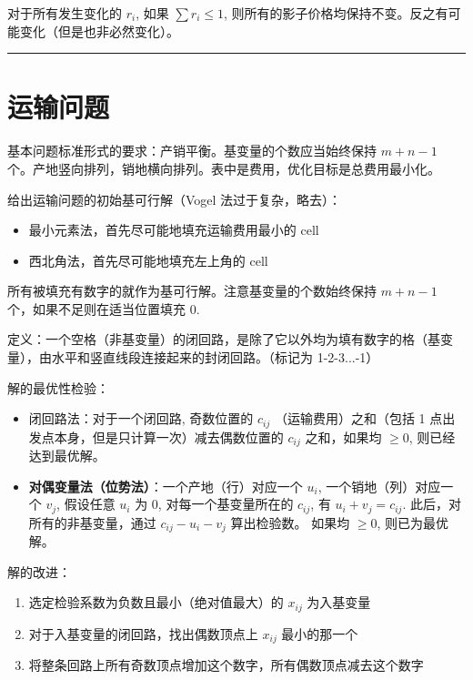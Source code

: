 \documentclass[UTF8, 6pt]{ctexart}
\newcommand{\mcompress}{\vspace{-10 px}}
\newcommand{\sectionline}{\rule[2pt]{0.45\textwidth}{0.05em}}
\begin{document}
对于所有发生变化的 $r_i$, 如果 $\sum r_i \leq 1$, 则所有的影子价格均保持不变。反之有可能变化（但是也非必然变化）。




\sectionline

\mcompress
\mcompress

\section{运输问题}

基本问题标准形式的要求：产销平衡。基变量的个数应当始终保持 $m+n-1$ 个。产地竖向排列，销地横向排列。表中是费用，优化目标是总费用最小化。

给出运输问题的初始基可行解（Vogel 法过于复杂，略去）：

\begin{itemize}
	\item 最小元素法，首先尽可能地填充运输费用最小的 cell
	\item 西北角法，首先尽可能地填充左上角的 cell
\end{itemize}

所有被填充有数字的就作为基可行解。注意基变量的个数始终保持 $m+n-1$ 个，如果不足则在适当位置填充 0.

定义：一个空格（非基变量）的闭回路，是除了它以外均为填有数字的格（基变量），由水平和竖直线段连接起来的封闭回路。（标记为 1-2-3...-1）

解的最优性检验：

\begin{itemize}
	\item 闭回路法：对于一个闭回路, 奇数位置的 $c_{ij}$ （运输费用）之和（包括 1 点出发点本身，但是只计算一次）减去偶数位置的 $c_{ij}$ 之和，如果均 $\geq 0$, 则已经达到最优解。
	\item \textbf{对偶变量法（位势法）}：一个产地（行）对应一个 $u_i$, 一个销地（列）对应一个 $v_j$, 假设任意 $u_i$ 为 0, 对每一个基变量所在的 $c_{ij}$, 有 $u_i + v_j = c_{ij}$.
	此后，对所有的非基变量，通过 $c_{ij} - u_i - v_j$ 算出检验数。
	如果均 $\geq 0$, 则已为最优解。
\end{itemize}

解的改进：

\begin{enumerate}
	\item 选定检验系数为负数且最小（绝对值最大）的 $x_{ij}$ 为入基变量
	\item 对于入基变量的闭回路，找出偶数顶点上 $x_{ij}$ 最小的那一个
	\item 将整条回路上所有奇数顶点增加这个数字，所有偶数顶点减去这个数字
\end{enumerate}
\end{document}
